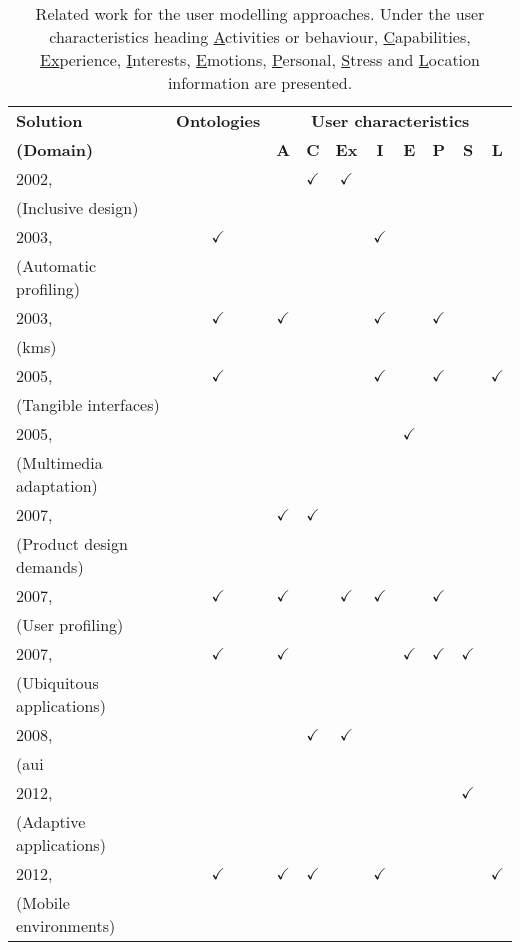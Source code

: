 \begin{table}
  \caption{Related work for the user modelling approaches. Under the user
 characteristics heading \underline{A}ctivities or behaviour, \underline{C}apabilities,
 \underline{Ex}perience,  \underline{I}nterests, \underline{E}motions,
 \underline{P}ersonal, \underline{S}tress and \underline{L}ocation information
 are presented.}
 \label{tbl:user_comparison}
\footnotesize
\centering
 \begin{tabular}{l c c c c c c c c c}
  \hline 
  \textbf{Solution} & \textbf{Ontologies} & \multicolumn{8}{c}{\textbf{User characteristics}}\\
  \textbf{(Domain)} & & \textbf{A} & \textbf{C} & \textbf{Ex} & \textbf{I} & \textbf{E} & \textbf{P} & \textbf{S} & \textbf{L} \\
  \hline
  
  2002,~\citet{gregor_designing_2002}		&  		& & $\checkmark$ & $\checkmark$ & & & & & \\
  (Inclusive design)\\
  2003,~\citet{gauch_ontology_based_2003}	& $\checkmark$	& & & & $\checkmark$ & & & &\\
  (Automatic profiling)\\ 
  2003,~\citet{razmerita_ontology_based_2003}	& $\checkmark$	& $\checkmark$ & & & $\checkmark$ & & $\checkmark$ & & \\
  (\ac{kms})\\				
  2005,~\citet{hatala_ontology_based_2005} 	& $\checkmark$ 	& & & & $\checkmark$ & & $\checkmark$ & & $\checkmark$ \\
  (Tangible interfaces)\\		
  2005,~\citet{pereira_triple_2005} 		& 		& & & & & $\checkmark$ & & &  \\
  (Multimedia adaptation)\\
  2007,~\citet{persad_characterising_2007} 	&   		& $\checkmark$ & $\checkmark$ & & & & & & \\
  (Product design demands)\\
  2007,~\citet{golemati_creating_2007} 		&  $\checkmark$   	& $\checkmark$ & & $\checkmark$ & $\checkmark$ & & $\checkmark$ & & \\
  (User profiling)\\
  2007,~\citet{heckmann_gumogeneral_2005} 	& $\checkmark$   	& $\checkmark$ & & & & $\checkmark$ & $\checkmark$ & $\checkmark$ & \\
  (Ubiquitous applications)\\
  2008,~\citet{casas_user_2008} 		&  		& & $\checkmark$ & $\checkmark$ & & & & & \\
  (\ac{aui}\\
  2012,~\citet{evers_achieving_2012} 		&  		& & & & & & & $\checkmark$ & \\
  (Adaptive applications)\\
  2012,~\citet{skillen2012ontological} 		&  $\checkmark$	& $\checkmark$ & $\checkmark$ & & $\checkmark$ & & & & $\checkmark$ \\
  (Mobile environments)\\
  \hline

\end{tabular}
\end{table}